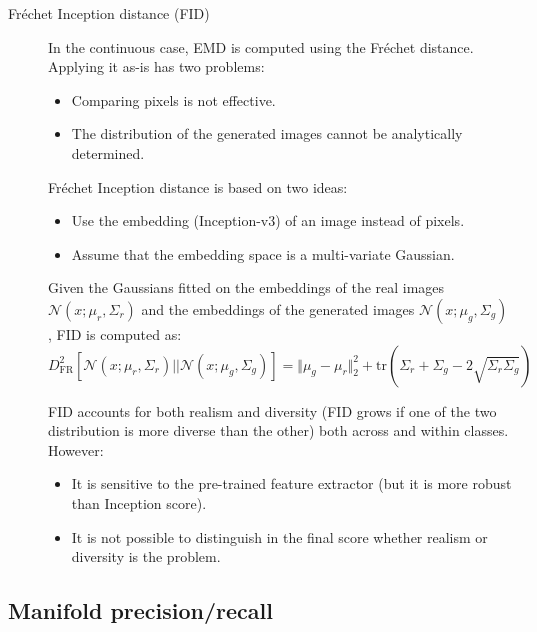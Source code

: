 \begin{description}
    \item[Fréchet Inception distance (FID)] 
        \begin{remark}
            In the continuous case, EMD is computed using the Fréchet distance. Applying it as-is has two problems:
            \begin{itemize}
                \item Comparing pixels is not effective.
                \item The distribution of the generated images cannot be analytically determined.
            \end{itemize} 
        \end{remark}

        Fréchet Inception distance is based on two ideas:
        \begin{itemize}
            \item Use the embedding (Inception-v3) of an image instead of pixels.
            \item Assume that the embedding space is a multi-variate Gaussian.
        \end{itemize}
        Given the Gaussians fitted on the embeddings of the real images $\mathcal{N}(x; \mu_r, \Sigma_r)$ and the embeddings of the generated images $\mathcal{N}(x; \mu_g, \Sigma_g)$, FID is computed as:
        \[ 
            D_\text{FR}^2\left[ \mathcal{N}(x; \mu_r, \Sigma_r) || \mathcal{N}(x; \mu_g, \Sigma_g) \right] = \Vert \mu_g - \mu_r \Vert^2_2 + \text{tr}\left( \Sigma_r + \Sigma_g - 2\sqrt{\Sigma_r \Sigma_g} \right)
        \]
    
    \begin{remark}
        FID accounts for both realism and diversity (FID grows if one of the two distribution is more diverse than the other) both across and within classes. However:
        \begin{itemize}
            \item It is sensitive to the pre-trained feature extractor (but it is more robust than Inception score).
            \item It is not possible to distinguish in the final score whether realism or diversity is the problem.
        \end{itemize}
    \end{remark}
\end{description}


\subsection{Manifold precision/recall}

